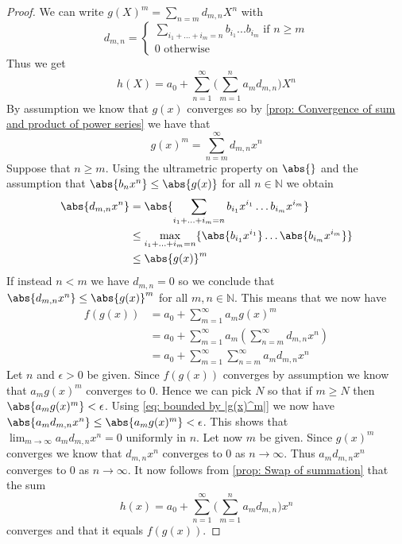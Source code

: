 \documentclass{article}
\newcommand{\mbb}[1]{\mathbb{#1}}
\numberwithin{equation}{section}
\begin{document}
\begin{proof}
    We can write $g(X)^m = \sum_{n = m}d_{m,n} X^n$ with
    $$d_{m,n} = \begin{cases}
            \sum_{i_1 + ... + i_m = n}b_{i_1}...b_{i_m} \text{ if } n \geq m \\
            0 \text{ otherwise}
        \end{cases}$$
    Thus we get
    $$h(X) = a_0 + \sum_{n = 1}^\infty\bigl(\sum_{m=1}^n a_m d_{m,n}  \bigr)X^n$$
    By assumption we know that $g(x)$ converges so by \cref{prop: Convergence of sum and product of power series} we have that
    $$g(x)^m = \sum_{n = m}^\infty d_{m,n}x^n$$
    Suppose that $n \geq m$. Using the ultrametric property on $\abs{}$ and the assumption that $\abs{b_nx^n} \leq \abs{g(x)}$ for all $n \in \mbb N$ we obtain
    \begin{equation}
        \begin{aligned}
            \abs{d_{m,n} x^n} & = \abs{\sum_{i_1 + \ldots + i_m = n} b_{i_1} x^{i_1} \ldots b_{i_m} x^{i_m}}              \\
                              & \leq \max_{i_1 + \ldots + i_m = n} \{\abs{b_{i_1} x^{i_1}} \ldots  \abs{b_{i_m} x^{i_m}}\} \\
                              & \leq \abs{g(x)}^m
        \end{aligned}
        \label{eq: bounded by |g(x)^m|}
    \end{equation}
    If instead $n < m$ we have $d_{m,n} = 0$ so we conclude that $\abs{d_{m,n} x^n} \leq \abs {g(x)}^m$ for all $m,n \in \mbb N$. This means that we now have
    \begin{align*}
        f(g(x)) & = a_0 + \sum_{m = 1}^\infty a_m g(x)^m                            \\
                & = a_0 + \sum_{m = 1}^\infty a_m (\sum_{n = m}^\infty d_{m,n} x^n) \\
                & = a_0 + \sum_{m = 1}^\infty \sum_{n = m}^\infty a_m d_{m,n} x^n
    \end{align*}
    Let $n$ and $\epsilon > 0$ be given. Since $f(g(x))$ converges by assumption we know that $a_m g(x)^m$ converges to 0. Hence we can pick $N$ so that if $m \geq N$ then $\abs{a_m g(x)^m} < \epsilon$. Using \cref{eq: bounded by |g(x)^m|} we now have
    $\abs{a_m d_{m,n}x^n} \leq \abs{a_m g(x)^m} < \epsilon$. This shows that $\lim_{m \to \infty} a_m d_{m,n}x^n = 0 \text{ uniformly in } n$. Let now $m$ be given. Since $g(x)^m$ converges we know that $d_{m,n}x^n$ converges to 0 as $n \to \infty$. Thus $a_m d_{m,n}x^n$ converges to 0 as $n \to \infty$. It now follows from \cref{prop: Swap of summation} that the sum
    $$h(x) = a_0 + \sum_{n = 1}^\infty\bigl(\sum_{m=1}^n a_m d_{m,n}  \bigr)x^n$$
    converges and that it equals $f(g(x))$.
\end{proof}
\end{document}
